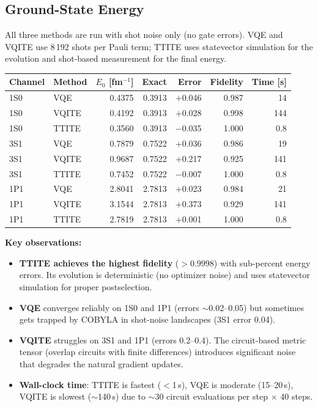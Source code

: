 \documentclass[11pt,a4paper]{article}
\begin{document}
\subsection{Ground-State Energy}

All three methods are run with shot noise only (no gate errors).
VQE and VQITE use 8\,192 shots per Pauli term; TTITE uses statevector
simulation for the evolution and shot-based measurement for the final energy.

\begin{center}
\small
\begin{tabular}{@{}l l r r r r r@{}}
\toprule
Channel & Method & $E_0$ [fm$^{-1}$] & Exact & Error & Fidelity & Time [s] \\
\midrule
1S0 & VQE   & 0.4375 & 0.3913 & $+$0.046 & 0.987 & 14 \\
1S0 & VQITE & 0.4192 & 0.3913 & $+$0.028 & 0.998 & 144 \\
1S0 & TTITE & 0.3560 & 0.3913 & $-$0.035 & 1.000 & 0.8 \\
\midrule
3S1 & VQE   & 0.7879 & 0.7522 & $+$0.036 & 0.986 & 19 \\
3S1 & VQITE & 0.9687 & 0.7522 & $+$0.217 & 0.925 & 141 \\
3S1 & TTITE & 0.7452 & 0.7522 & $-$0.007 & 1.000 & 0.8 \\
\midrule
1P1 & VQE   & 2.8041 & 2.7813 & $+$0.023 & 0.984 & 21 \\
1P1 & VQITE & 3.1544 & 2.7813 & $+$0.373 & 0.929 & 141 \\
1P1 & TTITE & 2.7819 & 2.7813 & $+$0.001 & 1.000 & 0.8 \\
\bottomrule
\end{tabular}
\end{center}

\textbf{Key observations:}
\begin{itemize}[nosep]
  \item \textbf{TTITE achieves the highest fidelity} ($>0.9998$) with
    sub-percent energy errors. Its evolution is deterministic (no optimizer
    noise) and uses statevector simulation for proper postselection.
  \item \textbf{VQE} converges reliably on 1S0 and 1P1 (errors $\sim$0.02--0.05)
    but sometimes gets trapped by COBYLA in shot-noise landscapes (3S1 error 0.04).
  \item \textbf{VQITE} struggles on 3S1 and 1P1 (errors 0.2--0.4). The
    circuit-based metric tensor (overlap circuits with finite differences)
    introduces significant noise that degrades the natural gradient updates.
  \item \textbf{Wall-clock time}: TTITE is fastest ($<$1\,s), VQE is moderate
    (15--20\,s), VQITE is slowest ($\sim$140\,s) due to $\sim$30 circuit
    evaluations per step $\times$ 40 steps.
\end{itemize}
\end{document}
